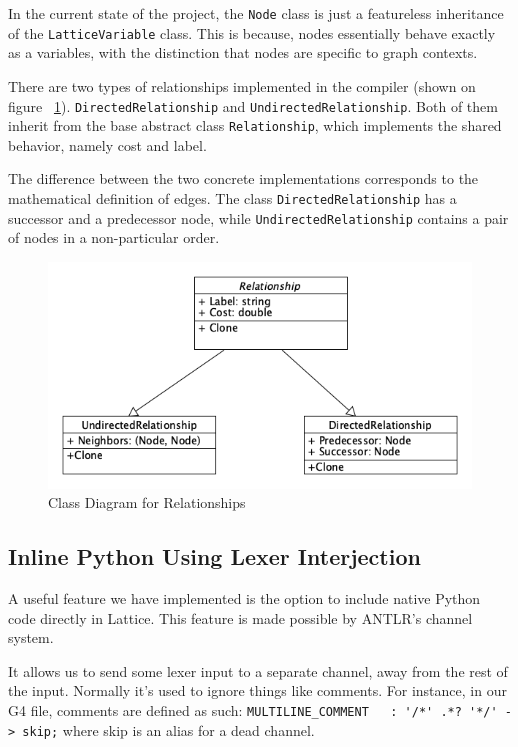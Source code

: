 In the current state of the project, the \lstinline{Node} class is just a featureless inheritance of the \lstinline{LatticeVariable} class.
This is because, nodes essentially behave exactly as a variables, with the distinction that nodes are specific to graph contexts.

There are two types of relationships implemented in the compiler (shown on figure ~\ref{fig:relationships}).
\lstinline{DirectedRelationship} and \lstinline{UndirectedRelationship}.
Both of them inherit from the base abstract class \lstinline{Relationship}, which implements the shared behavior,
namely cost and label.

The difference between the two concrete implementations corresponds to the mathematical definition of edges.
The class \lstinline{DirectedRelationship} has a successor and a predecessor node, while \lstinline{UndirectedRelationship}
contains a pair of nodes in a non-particular order.

\begin{figure}[H]
\centering
\includegraphics[width=12cm]{figures/implementation_section/relationships}
\caption{Class Diagram for Relationships}
\label{fig:relationships}
\end{figure}


\subsection{Inline Python Using Lexer Interjection}
A useful feature we have implemented is the option to include native Python code directly in Lattice.
This feature is made possible by ANTLR's channel system.

It allows us to send some lexer input to a separate channel, away from the rest of the input.
Normally it's used to ignore things like comments.
For instance, in our G4 file, comments are defined as such: \lstinline{MULTILINE_COMMENT   : '/*' .*? '*/' -> skip;}
where skip is an alias for a dead channel.

